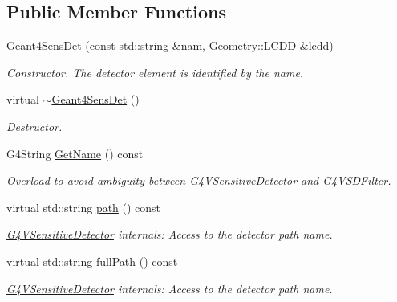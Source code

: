 \subsection*{Public Member Functions}
\begin{DoxyCompactItemize}
\item 
\hyperlink{class_d_d4hep_1_1_simulation_1_1_geant4_sens_det_a3e1c226eea8d6027fabf211df59fa4c4}{Geant4SensDet} (const std::string \&nam, \hyperlink{class_d_d4hep_1_1_geometry_1_1_l_c_d_d}{Geometry::LCDD} \&lcdd)
\begin{DoxyCompactList}\small\item\em Constructor. The detector element is identified by the name. \item\end{DoxyCompactList}\item 
virtual \hyperlink{class_d_d4hep_1_1_simulation_1_1_geant4_sens_det_a29286fa61cf355cd3572e73bf5e77204}{$\sim$Geant4SensDet} ()
\begin{DoxyCompactList}\small\item\em Destructor. \item\end{DoxyCompactList}\item 
G4String \hyperlink{class_d_d4hep_1_1_simulation_1_1_geant4_sens_det_a7cac5ff88bc88592fbf0ddef35d2f377}{GetName} () const 
\begin{DoxyCompactList}\small\item\em Overload to avoid ambiguity between \hyperlink{class_g4_v_sensitive_detector}{G4VSensitiveDetector} and \hyperlink{class_g4_v_s_d_filter}{G4VSDFilter}. \item\end{DoxyCompactList}\item 
virtual std::string \hyperlink{class_d_d4hep_1_1_simulation_1_1_geant4_sens_det_ab5c9a049efc9b8e19c75fc11aa1622cc}{path} () const 
\begin{DoxyCompactList}\small\item\em \hyperlink{class_g4_v_sensitive_detector}{G4VSensitiveDetector} internals: Access to the detector path name. \item\end{DoxyCompactList}\item 
virtual std::string \hyperlink{class_d_d4hep_1_1_simulation_1_1_geant4_sens_det_a7abea9524758bf79778a0b32edb280ae}{fullPath} () const 
\begin{DoxyCompactList}\small\item\em \hyperlink{class_g4_v_sensitive_detector}{G4VSensitiveDetector} internals: Access to the detector path name. \item\end{DoxyCompactList}\item 

\end{DoxyCompactItemize}
